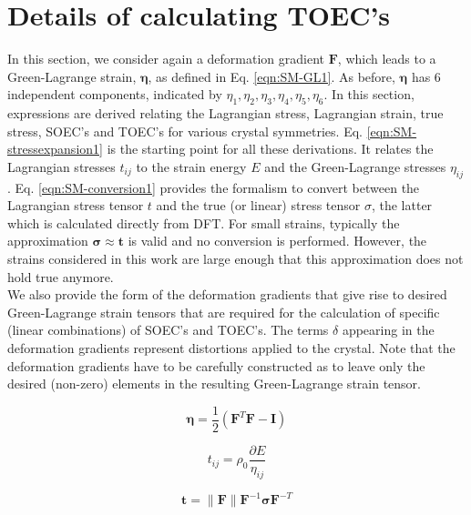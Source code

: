 \documentclass[showpacs,aps,floatfix,prb,reprint,superscriptaddress,onecolumn]{revtex4-1}
\begin{document}
\section{Details of calculating TOEC's}
In this section, we consider again a deformation gradient $\mathbf{F}$, which leads to a Green-Lagrange strain, $\mathbf{\mathbf{\eta}}$, as defined in Eq. \ref{eqn:SM-GL1}. As before, $\mathbf{\bm{\eta}}$ has 6 independent components, indicated by $\eta_{1}, \eta_{2}, \eta_{3}, \eta_{4}, \eta_{5}, \eta_{6}$. In this section, expressions are derived relating the Lagrangian stress, Lagrangian strain, true stress, SOEC's and TOEC's for various crystal symmetries. Eq. \ref{eqn:SM-stressexpansion1} is the starting point for all these derivations. It relates the Lagrangian stresses $t_{ij}$ to the strain energy $E$ and the Green-Lagrange stresses $\eta_{ij}$. Eq. \ref{eqn:SM-conversion1} provides the formalism to convert between the Lagrangian stress tensor $t$ and the true (or linear) stress tensor $\sigma$, the latter which is calculated directly from DFT. For small strains, typically the approximation $\bm{\sigma} \approx \bm{t}$ is valid and no conversion is performed. However, the strains considered in this work are large enough that this approximation does not hold true anymore. \\

We also provide the form of the deformation gradients that give rise to desired Green-Lagrange strain tensors that are required for the calculation of specific (linear combinations) of SOEC's and TOEC's. The terms $\delta$ appearing in the deformation gradients represent distortions applied to the crystal. Note that the deformation gradients have to be carefully constructed as to leave only the desired (non-zero) elements in the resulting Green-Lagrange strain tensor.

\begin{equation}
\label{eqn:SM-GL1} 
\bm{\eta} = \frac{1}{2} \left(\bm{F}^{T} \bm{F} - \bm{I} \right)
\end{equation}

\begin{equation}
\label{eqn:SM-stressexpansion1} 
t_{ij} = \rho_{0} \frac{\partial E}{\eta_{ij}}
\end{equation}

\begin{equation}
\label{eqn:SM-conversion1} 
\bm{t} = \|\bm{F}\| \bm{F}^{-1} \bm{\sigma} \bm{F}^{-T}
\end{equation}
\end{document}
